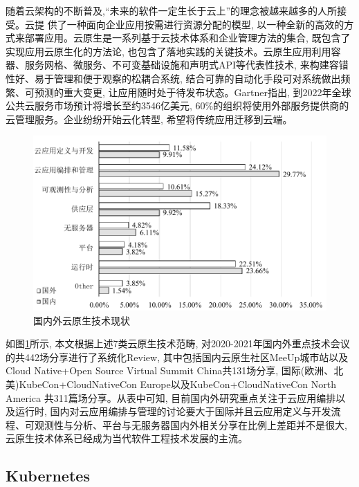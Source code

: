 随着云架构的不断普及,“未来的软件一定生长于云上”的理念被越来越多的人所接受。云提
供了一种面向企业应用按需进行资源分配的模型, 以一种全新的高效的方式来部署应用。云原生是一系列基于云技术体系和企业管理方法的集合, 既包含了实现应用云原生化的方法论, 也包含了落地实践的关键技术。云原生应用利用容器、服务网格、微服务、不可变基础设施和声明式API等代表性技术, 来构建容错性好、易于管理和便于观察的松耦合系统, 结合可靠的自动化手段可对系统做出频繁、可预测的重大变更, 让应用随时处于待发布状态。Gartner指出, 到2022年全球公共云服务市场预计将增长至约3546亿美元, 60\%的组织将使用外部服务提供商的云管理服务\cite{bhagavan2020achieving}。企业纷纷开始云化转型, 希望将传统应用迁移到云端。

\begin{figure}[h] %
    \centering %
    \includegraphics[width=0.9 \textwidth]{FIGs/chapter2/workshop.pdf} %
    \caption{国内外云原生技术现状} %
    \label{workshop} %
\end{figure}%

如图\ref{workshop}所示, 本文根据上述7类云原生技术范畴, 对2020-2021年国内外重点技术会议的共442场分享进行了系统化Review, 其中包括国内云原生社区MeeUp城市站以及Cloud Native+Open Source Virtual Summit China共131场分享, 国际(欧洲、北美)KubeCon+CloudNativeCon Europe以及KubeCon+CloudNativeCon North America 共311篇场分享。从表中可知, 目前国内外研究重点关注于云应用编排以及运行时, 国内对云应用编排与管理的讨论要大于国际并且云应用定义与开发流程、可观测性与分析、平台与无服务器国内外相关分享在比例上差距并不是很大, 云原生技术体系已经成为当代软件工程技术发展的主流。

\subsection{Kubernetes}

